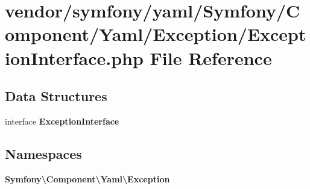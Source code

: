 \section{vendor/symfony/yaml/\+Symfony/\+Component/\+Yaml/\+Exception/\+Exception\+Interface.php File Reference}
\label{symfony_2yaml_2_symfony_2_component_2_yaml_2_exception_2_exception_interface_8php}
\subsection*{Data Structures}
\begin{DoxyCompactItemize}
\item 
interface {\bf Exception\+Interface}
\end{DoxyCompactItemize}
\subsection*{Namespaces}
\begin{DoxyCompactItemize}
\item 
 {\bf Symfony\textbackslash{}\+Component\textbackslash{}\+Yaml\textbackslash{}\+Exception}
\end{DoxyCompactItemize}

